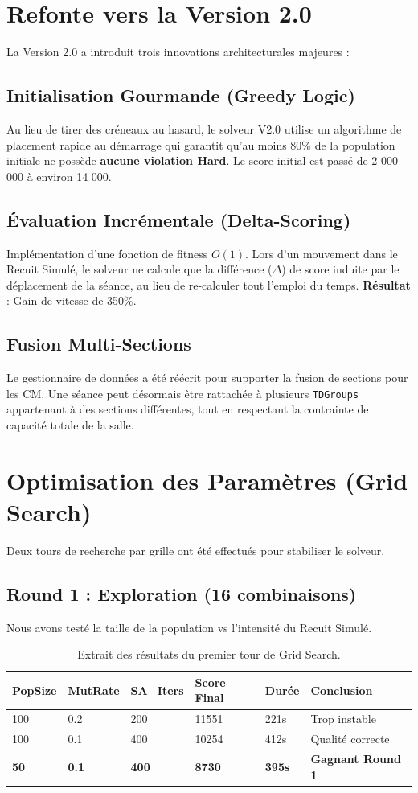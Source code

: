 \documentclass{article}
\begin{document}
\section{Refonte vers la Version 2.0}
La Version 2.0 a introduit trois innovations architecturales majeures :

\subsection{Initialisation Gourmande (Greedy Logic)}
Au lieu de tirer des créneaux au hasard, le solveur V2.0 utilise un algorithme de placement rapide au démarrage qui garantit qu'au moins 80\% de la population initiale ne possède \textbf{aucune violation Hard}. Le score initial est passé de 2 000 000 à environ 14 000.

\subsection{Évaluation Incrémentale (Delta-Scoring)}
Implémentation d'une fonction de fitness $O(1)$. Lors d'un mouvement dans le Recuit Simulé, le solveur ne calcule que la différence ($\Delta$) de score induite par le déplacement de la séance, au lieu de re-calculer tout l'emploi du temps. 
\textbf{Résultat} : Gain de vitesse de 350\%.

\subsection{Fusion Multi-Sections}
Le gestionnaire de données a été réécrit pour supporter la fusion de sections pour les CM. Une séance peut désormais être rattachée à plusieurs \texttt{TDGroups} appartenant à des sections différentes, tout en respectant la contrainte de capacité totale de la salle.

\section{Optimisation des Paramètres (Grid Search)}
Deux tours de recherche par grille ont été effectués pour stabiliser le solveur.

\subsection{Round 1 : Exploration (16 combinaisons)}
Nous avons testé la taille de la population vs l'intensité du Recuit Simulé.
\begin{table}[h]
\centering
\begin{tabular}{@{}llllll@{}}
\toprule
PopSize & MutRate & SA\_Iters & Score Final & Durée & Conclusion \\ \midrule
100 & 0.2 & 200 & 11551 & 221s & Trop instable \\
100 & 0.1 & 400 & 10254 & 412s & Qualité correcte \\
\textbf{50} & \textbf{0.1} & \textbf{400} & \textbf{8730} & \textbf{395s} & \textbf{Gagnant Round 1} \\ \bottomrule
\end{tabular}
\caption{Extrait des résultats du premier tour de Grid Search.}
\end{table}
\end{document}
